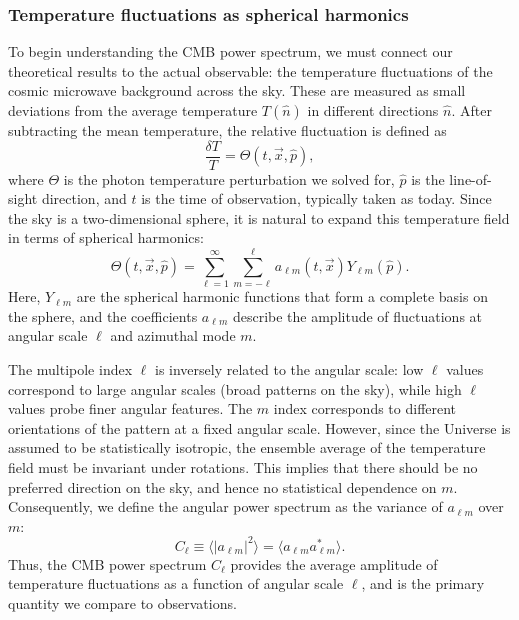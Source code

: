 \documentclass{aa}
\numberwithin{equation}{section}
\numberwithin{table}{section}
\numberwithin{figure}{section}
\begin{document}
\subsubsection{Temperature fluctuations as spherical harmonics}
\color{Plum}
To begin understanding the CMB power spectrum, we must connect our theoretical results to the actual observable: the temperature fluctuations of the cosmic microwave background across the sky. These are measured as small deviations from the average temperature $T(\hat{n})$ in different directions $\hat{n}$. After subtracting the mean temperature, the relative fluctuation is defined as  
\begin{equation}
\frac{\delta T}{T} = \Theta(t,\vec{x}, \hat{p}),
\end{equation}
where $\Theta$ is the photon temperature perturbation we solved for, $\hat{p}$ is the line-of-sight direction, and $t$ is the time of observation, typically taken as today. Since the sky is a two-dimensional sphere, it is natural to expand this temperature field in terms of spherical harmonics:  
\begin{equation}
\Theta(t, \vec{x}, \hat{p}) = \sum_{\ell=1}^{\infty} \sum_{m=-\ell}^{\ell} a_{\ell m}(t, \vec{x}) Y_{\ell m}(\hat{p}).
\end{equation}
Here, $Y_{\ell m}$ are the spherical harmonic functions that form a complete basis on the sphere, and the coefficients $a_{\ell m}$ describe the amplitude of fluctuations at angular scale $\ell$ and azimuthal mode $m$.

The multipole index $\ell$ is inversely related to the angular scale: low $\ell$ values correspond to large angular scales (broad patterns on the sky), while high $\ell$ values probe finer angular features. The $m$ index corresponds to different orientations of the pattern at a fixed angular scale. However, since the Universe is assumed to be statistically isotropic, the ensemble average of the temperature field must be invariant under rotations. This implies that there should be no preferred direction on the sky, and hence no statistical dependence on $m$. Consequently, we define the angular power spectrum as the variance of $a_{\ell m}$ over $m$:  
\begin{equation}
C_\ell \equiv \langle |a_{\ell m}|^2 \rangle = \langle a_{\ell m} a^*_{\ell m} \rangle.
\end{equation}
Thus, the CMB power spectrum $C_\ell$ provides the average amplitude of temperature fluctuations as a function of angular scale $\ell$, and is the primary quantity we compare to observations.
\end{document}

